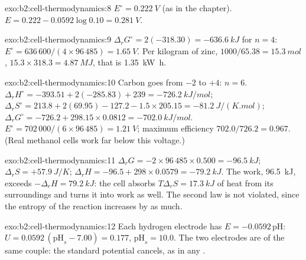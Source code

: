 \begin{solution}{exo:b2:cell-thermodynamics:8}
$E^\circ = \qty{0.222}{V}$ (as in the chapter). $E = 0.222 - 0.0592\log 0.10 =
\qty{0.281}{V}$.
\end{solution}

\begin{solution}{exo:b2:cell-thermodynamics:9}
$\Delta_r G^\circ = 2(-318.30) = \qty{-636.6}{kJ}$ for $n = 4$: $E^\circ =
636\,600/(4 \times 96\,485) = \qty{1.65}{V}$. Per kilogram of zinc, $1000/65.38 =
\qty{15.3}{mol}$, $15.3 \times 318.3 = \qty{4.87}{MJ}$, that is \qty{1.35}{kW.h}.
\end{solution}

\begin{solution}{exo:b2:cell-thermodynamics:10}
Carbon goes from $-2$ to $+4$: $n = 6$. $\Delta_r H^\circ = -393.51 + 2(-285.83) +
239 = \qty{-726.2}{kJ/mol}$; $\Delta_r S^\circ = 213.8 + 2(69.95) - 127.2 - 1.5
\times 205.15 = \qty{-81.2}{J/(K.mol)}$; $\Delta_r G^\circ = -726.2 + 298.15 \times
0.0812 = \qty{-702.0}{kJ/mol}$. $E^\circ = 702\,000/(6 \times 96\,485) =
\qty{1.21}{V}$; maximum efficiency $702.0/726.2 = 0.967$. (Real methanol cells
work far below this voltage.)
\end{solution}

\begin{solution}{exo:b2:cell-thermodynamics:11}
$\Delta_r G = -2 \times 96\,485 \times 0.500 = \qty{-96.5}{kJ}$; $\Delta_r S = +\qty{57.9}{J/K}$;
$\Delta_r H = -96.5 + 298 \times 0.0579 = \qty{-79.2}{kJ}$. The work, \qty{96.5}{kJ},
exceeds $-\Delta_r H = \qty{79.2}{kJ}$: the cell absorbs $T\Delta_r S = \qty{17.3}{kJ}$
of heat from its surroundings and turns it into work as well. The second law
is not violated, since the entropy of the reaction increases by as much.
\end{solution}

\begin{solution}{exo:b2:cell-thermodynamics:12}
Each hydrogen electrode has $E = -0.0592\,\mathrm{pH}$: $U = 0.0592\,(\mathrm{pH}_s -
7.00) = 0.177$, $\mathrm{pH}_s = 10.0$. The two electrodes are of the same couple:
the standard potential cancels, as in any .
\end{solution}

